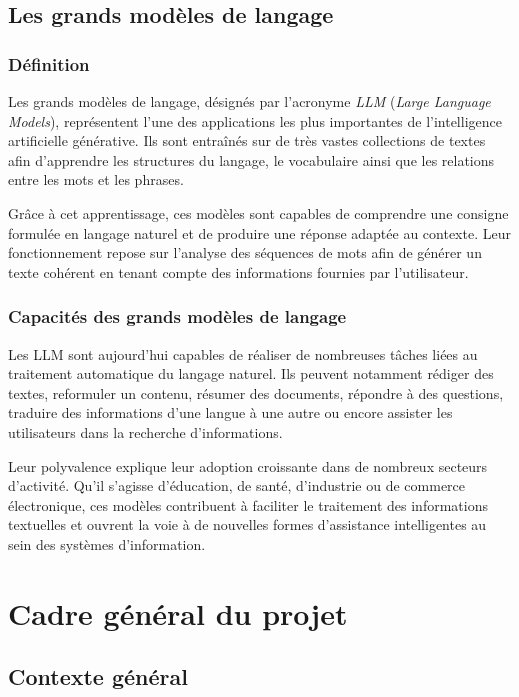 \subsection{Les grands modèles de langage}

\subsubsection{Définition}

Les grands modèles de langage, désignés par l'acronyme \textit{LLM} (\textit{Large Language Models}), représentent l'une des applications les plus importantes de l'intelligence artificielle générative. Ils sont entraînés sur de très vastes collections de textes afin d'apprendre les structures du langage, le vocabulaire ainsi que les relations entre les mots et les phrases.

Grâce à cet apprentissage, ces modèles sont capables de comprendre une consigne formulée en langage naturel et de produire une réponse adaptée au contexte. Leur fonctionnement repose sur l'analyse des séquences de mots afin de générer un texte cohérent en tenant compte des informations fournies par l'utilisateur.

\subsubsection{Capacités des grands modèles de langage}

Les LLM sont aujourd'hui capables de réaliser de nombreuses tâches liées au traitement automatique du langage naturel. Ils peuvent notamment rédiger des textes, reformuler un contenu, résumer des documents, répondre à des questions, traduire des informations d'une langue à une autre ou encore assister les utilisateurs dans la recherche d'informations.

Leur polyvalence explique leur adoption croissante dans de nombreux secteurs d'activité. Qu'il s'agisse d'éducation, de santé, d'industrie ou de commerce électronique, ces modèles contribuent à faciliter le traitement des informations textuelles et ouvrent la voie à de nouvelles formes d'assistance intelligentes au sein des systèmes d'information.




\section{Cadre général du projet}

\subsection{Contexte général}

